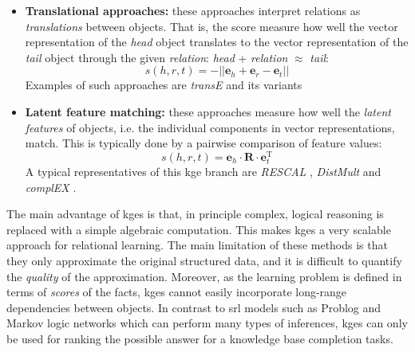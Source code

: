 \begin{itemize}
	\item \textbf{Translational approaches:} these approaches interpret relations as \textit{translations} between objects. That is, the score measure how well the vector representation of the \textit{head} object translates to the vector representation of the \textit{tail} object through the given \textit{relation}: \textit{head} + \textit{relation} $\approx$ \textit{tail}:
		\begin{equation}
			s(h,r,t) = - || \mathbf{e}_{h} + \mathbf{e}_{r} - \mathbf{e}_{t} ||
		\end{equation}
		Examples of such approaches are \textit{transE} \cite{Bordes:2013:TEM} and its variants \cite{Lin:2015:LER:2886521.2886624,nguyen-EtAl:2016:N16-1,Arbelaitz:2013,P15-1067}

	\item \textbf{Latent feature matching:} these approaches measure how well the \textit{latent features} of objects, i.e. the individual components in vector representations, match. This is typically done by a pairwise comparison of feature values:
	 	\begin{equation}
	 		s(h,r,t) = \mathbf{e}_{h} \cdot \mathbf{R} \cdot \mathbf{e}_{t}^{\text{T}}
	 	\end{equation}
	 	A typical representatives of this \gls{kge} branch are \textit{RESCAL} \cite{Nickel2011}, \textit{DistMult} \cite{YangYHGD14a} and \textit{complEX} \cite{trouillon2016complex}.
\end{itemize}


The main advantage of \gls{kge}s is that, in principle complex, logical reasoning is replaced with a simple algebraic computation.
This makes \gls{kge}s a very scalable approach for relational learning.
The main limitation of these methods is that they only approximate the original structured data, and it is difficult to quantify the \textit{quality} of the approximation.
Moreover, as the learning problem is defined in terms of \textit{scores} of the facts, \gls{kge}s cannot easily incorporate  long-range dependencies between objects.
In contrast to \gls{srl} models such as Problog and Markov logic networks which can perform many types of inferences, \gls{kge}s can only be used for ranking the possible answer for a knowledge base completion tasks.










